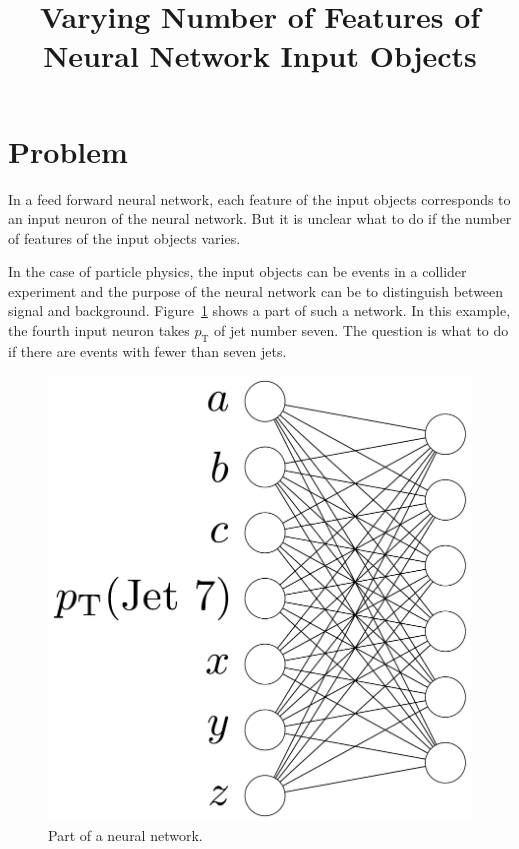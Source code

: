 \documentclass[12pt,a4paper]{article}
\title{Varying Number of Features of Neural Network Input Objects}
\author{}
\date{}
\begin{document}
\maketitle

\section{Problem}

In a feed forward neural network, each feature of the input objects corresponds to an input neuron of the neural network. But it is unclear what to do if the number of features of the input objects varies.

In the case of particle physics, the input objects can be events in a collider experiment and the purpose of the neural network can be to distinguish between signal and background. Figure~\ref{fig::NN_picture_1} shows a part of such a network. In this example, the fourth input neuron takes $p_\text{T}$ of jet number seven. The question is what to do if there are events with fewer than seven jets.


\begin{figure}
\begin{center}
\includegraphics[scale=0.4]{NN_picture_1.pdf}
\caption{Part of a neural network.}
\label{fig::NN_picture_1}
\end{center}
\end{figure}
\end{document}
